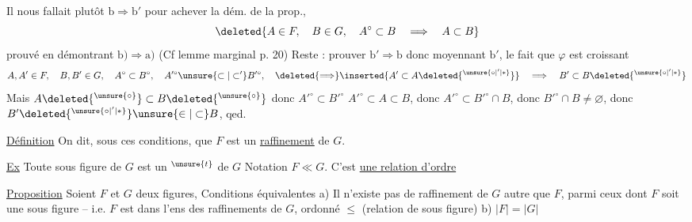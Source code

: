 Il nous fallait plutôt $\mathrm b\Rightarrow\mathrm b'$ pour achever la dém. de la prop.,    
\[ \deleted{A\in F,\quad B\in G,\quad A^\circ\subset B\quad\Longrightarrow\quad A\subset B} \]
 prouvé en démontrant $\mathrm b)\Rightarrow\mathrm a)$ (Cf lemme marginal p. 20) Reste : prouver $\mathrm b'\Rightarrow\mathrm b$ donc moyennant $\mathrm{b}'$, le fait que $\varphi$ est croissant
\[ A,A'\in F,\quad B,B'\in G,\quad A^\circ\subset B^\circ,\quad A'^\circ\unsure{\subset|\subset'}B'^\circ,\quad \deleted{\Longrightarrow}\inserted{A'\subset A\deleted{{}^{\unsure{\circ|'|*}}}}\quad\Longrightarrow\quad B'\subset B\deleted{{}^{\unsure{\circ|'|*}}} \]
Mais      $A\deleted{{}^{\unsure{\circ}}}\subset B\deleted{{}^{\unsure{\circ}}}$   donc $A'^\circ\subset B'^\circ$ 
$A'^\circ\subset A\subset B$, donc $A'^\circ\subset B'^\circ\cap B$, donc $B'^\circ\cap B\ne\varnothing$, donc $B'\deleted{{}^{\unsure{\circ|'|*}}}\unsure{\in|\subset}B$, qed.

\uline{Définition} On dit, sous ces conditions, que $F$ est un \uline{raffinement} de $G$.

\uline{Ex} Toute sous figure de $G$ est un $^{\unsure{t}}$ de $G$
Notation $F\ll G$. C'est \uline{une relation d'ordre}

\uline{Proposition} Soient $F$ et $G$ deux figures,  Conditions équivalentes
a)  Il n'existe pas de raffinement de $G$ autre que $F$, parmi ceux dont $F$ soit une sous figure -- i.e. $F$ est  dans l'ens des raffinements de $G$, ordonné  $\leq$ (relation de sous figure)
b)  $|F|=|G|$ 
